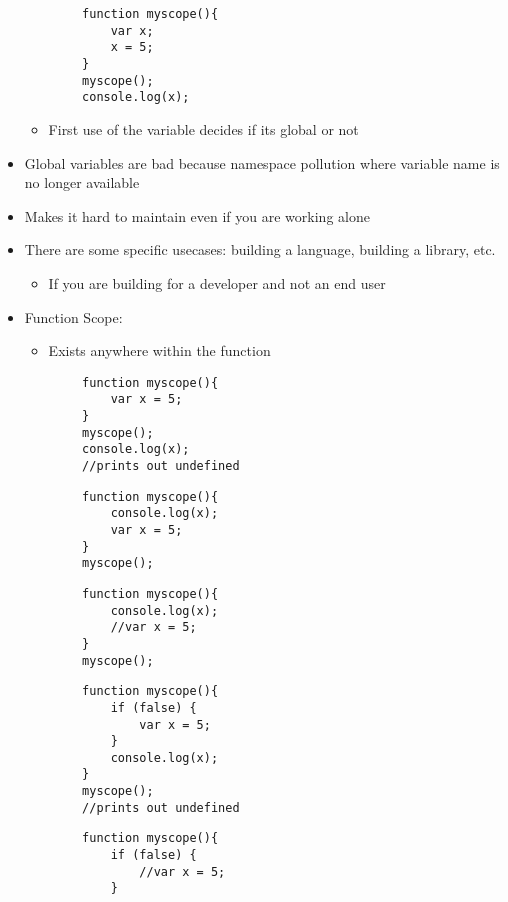 \documentclass{article}
\begin{document}
\begin{itemize}
\begin{itemize}
    \end{itemize}
    \begin{lstlisting}
        function myscope(){
            var x;
            x = 5;
        }
        myscope();
        console.log(x);
    \end{lstlisting}
    \begin{itemize}
        \item First use of the variable decides if its global or not
    \end{itemize}
    \item Global variables are bad because namespace pollution where variable name is no longer available
    \item Makes it hard to maintain even if you are working alone
    \item There are some specific usecases: building a language, building a library, etc.
    \begin{itemize}
        \item If you are building for a developer and not an end user
    \end{itemize}
    \item Function Scope:
    \begin{itemize}
        \item Exists anywhere within the function
    \end{itemize}
    \begin{lstlisting}
        function myscope(){
            var x = 5;
        }
        myscope();
        console.log(x);
        //prints out undefined
    \end{lstlisting}
    \begin{lstlisting}
        function myscope(){
            console.log(x);
            var x = 5;
        }
        myscope();
    \end{lstlisting}
    \begin{lstlisting}
        function myscope(){
            console.log(x);
            //var x = 5;
        }
        myscope();
    \end{lstlisting}
    \begin{lstlisting}
        function myscope(){
            if (false) {
                var x = 5;
            }
            console.log(x);
        }
        myscope();
        //prints out undefined
    \end{lstlisting}
    \begin{lstlisting}
        function myscope(){
            if (false) {
                //var x = 5;
            }

\end{lstlisting}
\end{itemize}
\end{document}
